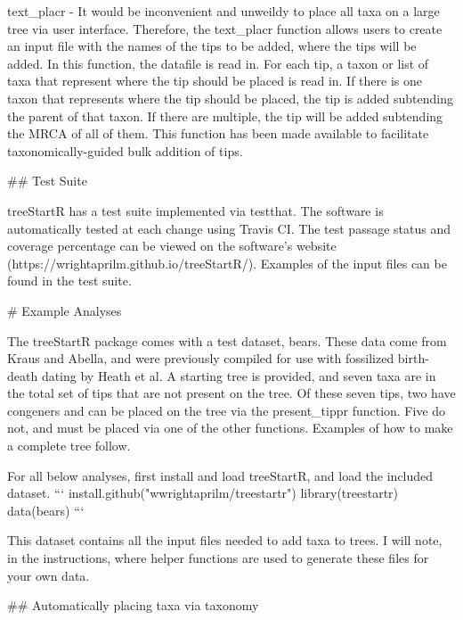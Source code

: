 text_placr - It would be inconvenient and unweildy to place all taxa on a large tree via user interface. 
Therefore, the text_placr function allows users to create an input file with the names of the tips to be added, where the tips will be added.
In this function, the datafile is read in. 
For each tip, a taxon or list of taxa that represent where the tip should be placed is read in.
If there is one taxon that represents where the tip should be placed, the tip is added subtending the parent of that taxon.
If there are multiple, the tip will be added subtending the MRCA of all of them.
This function has been made available to facilitate taxonomically-guided bulk addition of tips.

## Test Suite

treeStartR has a test suite implemented via testthat. 
The software is automatically tested at each change using Travis CI. 
The test passage status and coverage percentage can be viewed on the software's website (https://wrightaprilm.github.io/treeStartR/).
Examples of the input files can be found in the test suite.

# Example Analyses

The treeStartR package comes with a test dataset, bears.
These data come from Kraus and Abella, and were previously compiled for use with fossilized birth-death dating by Heath et al.
A starting tree is provided, and seven taxa are in the total set of tips that are not present on the tree.
Of these seven tips, two have congeners and can be placed on the tree via the present_tippr function.
Five do not, and must be placed via one of the other functions. 
Examples of how to make a complete tree follow. 

For all below analyses, first install and load treeStartR, and load the included dataset.
```
install.github("wwrightaprilm/treestartr")
library(treestartr)
data(bears)
```

This dataset contains all the input files needed to add taxa to trees. 
I will note, in the instructions, where helper functions are used to generate these files for your own data.

## Automatically placing taxa via taxonomy


